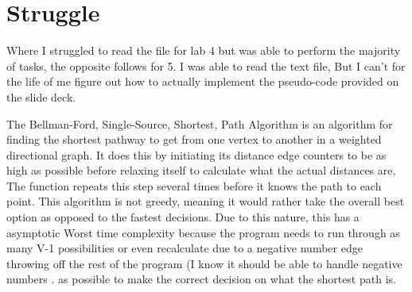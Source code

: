 \documentclass{article}
\begin{document}
\section{Struggle}
Where I struggled to read the file for lab 4 but was able to perform the majority of tasks, the opposite follows for 5. I was able to read the text file, But I can't for the life of me figure out how to actually implement the pseudo-code provided on the slide deck. 

The	Bellman-Ford, Single-Source, Shortest, Path Algorithm is an algorithm for finding the shortest pathway to get from one vertex to another in a weighted directional graph. It does this by initiating its distance edge counters to be as high as possible before relaxing itself to calculate what the actual distances are, The function repeats this step several times before it knows the path to each point. This algorithm is not greedy, meaning it would rather take the overall best option as opposed to the fastest decisions. Due to this nature, this has a asymptotic Worst time complexity because the program needs to run through as many V-1 possibilities or even recalculate due to a negative number edge throwing off the rest of the program (I know it should be able to handle negative numbers .  as possible to make the correct decision on what the shortest path is.
\end{document}
